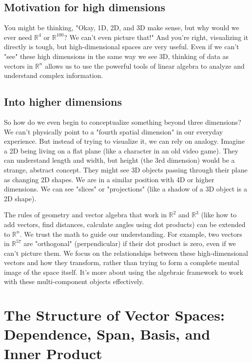 \documentclass[11pt]{article}
\begin{document}
\subsection{Motivation for high dimensions}

You might be thinking, "Okay, 1D, 2D, and 3D make sense, but why would we ever need $\mathbb{R}^4$ or $\mathbb{R}^{100}$? We can't even picture that!" And you're right, visualizing it directly is tough, but high-dimensional spaces are very useful. Even if we can't "see" these high dimensions in the same way we see 3D, thinking of data as vectors in $\mathbb{R}^n$ allows us to use the powerful tools of linear algebra to analyze and understand complex information.

\subsection{Into higher dimensions}

So how do we even begin to conceptualize something beyond three dimensions? We can't physically point to a "fourth spatial dimension" in our everyday experience.
But instead of trying to visualize it, we can rely on analogy. Imagine a 2D being living on a flat plane (like a character in an old video game). They can understand length and width, but height (the 3rd dimension) would be a strange, abstract concept. They might see 3D objects passing through their plane as changing 2D shapes. We are in a similar position with 4D or higher dimensions. We can see "slices" or "projections" (like a shadow of a 3D object is a 2D shape).

 The rules of geometry and vector algebra that work in $\mathbb{R}^2$ and $\mathbb{R}^3$ (like how to add vectors, find distances, calculate angles using dot products) can be extended to $\mathbb{R}^n$. We trust the math to guide our understanding. For example, two vectors in $\mathbb{R}^{57}$ are "orthogonal" (perpendicular) if their dot product is zero, even if we can't picture them. We focus on the relationships between these high-dimensional vectors and how they transform, rather than trying to form a complete mental image of the space itself. It's more about using the algebraic framework to work with these multi-component objects effectively.

\section{The Structure of Vector Spaces: Dependence, Span, Basis, and Inner Product}
\end{document}
